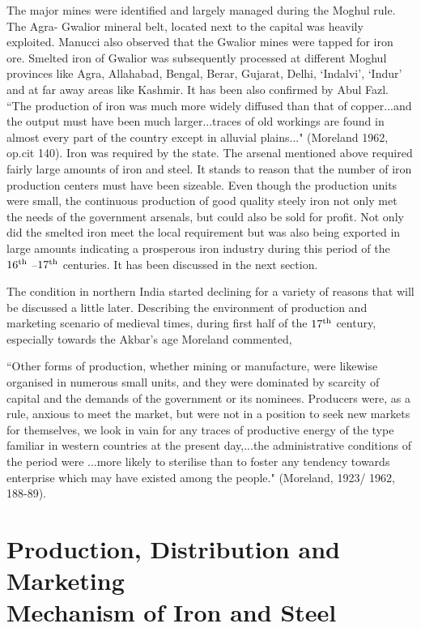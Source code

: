 The major mines were identified and largely managed during the Moghul rule. The Agra- Gwalior mineral belt, located next to the capital was heavily exploited. Manucci also observed that the Gwalior mines were tapped for iron ore. Smelted iron of Gwalior was subsequently processed at different Moghul provinces like Agra, Allahabad, Bengal, Berar, Gujarat, Delhi, `Indalvi', `Indur' and at far away areas like Kashmir. It has been also confirmed by Abul Fazl. ``The production of iron was much more widely diffused than that of copper...and the output must have been much larger...traces of old workings are found in almost every part of the country except in alluvial plains..." (Moreland 1962, op.cit  140). Iron was required by the state. The arsenal mentioned above required fairly large amounts of iron and steel. It stands to reason that the number of iron production centers must have been sizeable. Even though the production units were small, the continuous production of good quality steely iron not only met the needs of the government arsenals, but could also be sold for profit. Not only did the smelted iron meet the local requirement but was also being exported in large amounts indicating a prosperous iron industry during this period of the $16^{\rm th}$ –$17^{\rm th}$ centuries.   It has been discussed in the next section. 

The condition in northern India started declining for a variety of reasons that will be discussed a little later. Describing the environment of production and marketing scenario of medieval times, during first half of the $17^{\rm th}$ century, especially towards the Akbar's age Moreland commented, 

{\footnotesize{``Other forms of production, whether mining or manufacture, were likewise organised in numerous small units, and they were dominated by scarcity of capital and the demands of the government or its nominees. Producers were, as a rule, anxious to meet the market, but were not in a position to seek new markets for themselves, we look in vain for any traces of productive energy of the type familiar in western countries at the present day,...the administrative conditions of the period were ...more likely to sterilise than to foster any tendency towards enterprise which may have existed among the people."}} (Moreland, 1923/ 1962, 188-89).   

\vspace{-.5cm}

\section*{Production, Distribution and Marketing\\ Mechanism of Iron and Steel}\label{chapter5-section-3}

